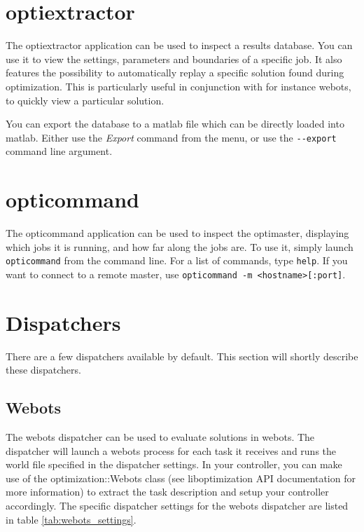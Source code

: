 \documentclass{report}
\begin{document}
\section{optiextractor}\label{app:optiextractor}
The optiextractor application can be used to inspect a results database. You
can use it to view the settings, parameters and boundaries of a specific
job. It also features the possibility to automatically replay a specific
solution found during optimization. This is particularly useful in conjunction
with for instance webots, to quickly view a particular solution.

You can export the database to a matlab file which can be directly loaded
into matlab. Either use the \textit{Export} command from the menu, or use the
\verb!--export! command line argument.

\section{opticommand}\label{app:opticommand}
The opticommand application can be used to inspect the optimaster, displaying
which jobs it is running, and how far along the jobs are. To use it, simply
launch \verb!opticommand! from the command line. For a list of commands, type
\verb!help!. If you want to connect to a remote master, use
\verb!opticommand -m <hostname>[:port]!.

\section{Dispatchers}
There are a few dispatchers available by default. This section will shortly
describe these dispatchers.

\subsection{Webots}
The webots dispatcher can be used to evaluate solutions in webots. The
dispatcher will launch a webots process for each task it receives and runs
the world file specified in the dispatcher settings. In your controller, you
can make use of the optimization::Webots class (see liboptimization API
documentation for more information) to extract the task description and setup
your controller accordingly. The specific dispatcher settings for the webots
dispatcher are listed in table \ref{tab:webots_settings}.
\end{document}
